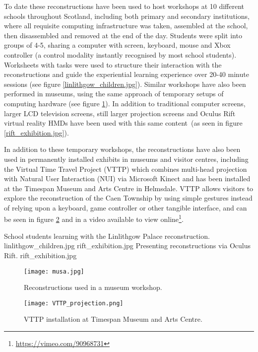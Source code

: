 To date these reconstructions have been used to host workshops at 10 different schools throughout Scotland, including both primary and secondary institutions, where all requisite computing infrastructure was taken, assembled at the school, then disassembled and removed at the end of the day. Students were split into groups of 4-5, sharing a computer with screen, keyboard, mouse and Xbox controller (a control modality instantly recognised by most school students). Worksheets with tasks were used to structure their interaction with the reconstructions and guide the experiential learning experience over 20-40 minute sessions (see figure \ref{linlithgow_children.jpg}). Similar workshops have also been performed in museums, using the same approach of temporary setups of computing hardware (see figure \ref{musa.jpg}). In addition to traditional computer screens, larger LCD television screens, still larger projection screens and Oculus Rift virtual reality HMDs have been used with this same content~(as seen in figure \ref{rift_exhibition.jpg}).

In addition to these temporary workshops, the reconstructions have also been used in permanently installed exhibits in museums and visitor centres, including the Virtual Time Travel Project (VTTP) which combines multi-head projection with Natural User Interaction (NUI) via Microsoft Kinect and has been installed at the Timespan Museum and Arts Centre in Helmsdale. VTTP allows visitors to explore the reconstruction of the Caen Township by using simple gestures instead of relying upon a keyboard, game controller or other tangible interface, and can be seen in figure \ref{VTTP_projection.png} and in a video available to view online\footnote{\url{https://vimeo.com/90968731}}.

 {School students learning with the Linlithgow Palace reconstruction.} {linlithgow_children.jpg}
       {rift_exhibition.jpg} {Presenting reconstructions via Oculus Rift.} {rift_exhibition.jpg}

\begin{figure}[h]
\centering
  \texttt{[image: musa.jpg]}
  \caption{Reconstructions used in a museum workshop.}
  \label{musa.jpg}
\end{figure}

\begin{figure}[h]
\centering
  \texttt{[image: VTTP\_projection.png]}
  \caption{VTTP installation at Timespan Museum and Arts Centre.}
  \label{VTTP_projection.png}
\end{figure}

